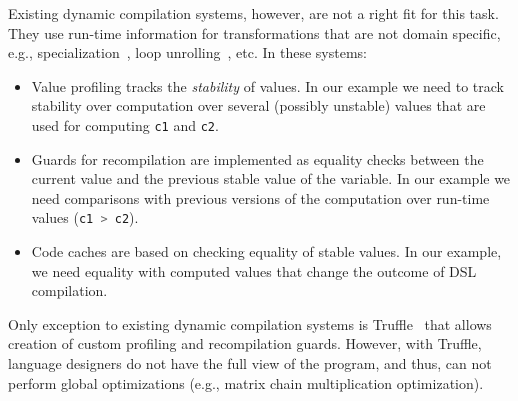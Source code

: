 \documentclass{llncs}
\newcommand{\scode}[1]{\lstinline[language=Scala,columns=fixed,basicstyle=\ttfamily,keywordstyle=\ttfamily]|#1|}
\newcommand{\code}[1]{\scode{#1}}
\begin{document}
Existing dynamic compilation systems, however, are not a right fit for this task.
 They use run-time information for transformations that are not domain specific, e.g., specialization~\cite{grant2000dyc}, loop unrolling~\cite{suganuma2001dynamic}, etc. In these systems:
\begin{itemize}

 \item Value profiling tracks the \emph{stability} of values. In our example
  we need to track stability over computation over several (possibly unstable)
  values that are used for computing \code{c1} and \code{c2}.

 \item Guards for recompilation are implemented as equality checks between the current value
  and the previous stable value of the variable. In our example we need comparisons with previous versions of
  the computation over run-time values (\code{c1 > c2}).

 \item Code caches are based on checking equality of stable values. In our example, we need equality
  with computed values that change the outcome of DSL compilation.

\end{itemize}

Only exception to existing dynamic compilation systems is Truffle~\cite{wurthinger2013one} that allows creation of custom profiling and recompilation guards. However, with Truffle, language designers do not have the full view of the program, and thus, can not perform global optimizations (e.g., matrix chain multiplication optimization).
\end{document}
